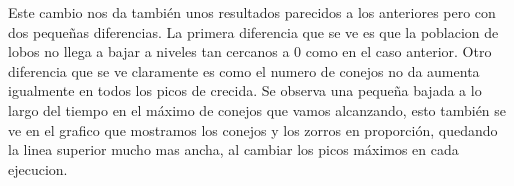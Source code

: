 \documentclass[]{article}
\begin{document}
\begin{figure}[H]
	\centering
	
\end{figure}

Este cambio nos da también unos resultados parecidos a los anteriores pero con dos pequeñas diferencias. La primera diferencia que se ve es que la poblacion de lobos no llega a bajar a niveles tan cercanos a 0 como en el caso anterior. Otro diferencia que se ve claramente es como el numero de conejos no da aumenta igualmente en todos los picos de crecida. Se observa una pequeña bajada a lo largo del tiempo en el máximo de conejos que vamos alcanzando, esto también se ve en el grafico que mostramos los conejos y los zorros en proporción, quedando la linea superior mucho mas ancha, al cambiar los picos máximos en cada ejecucion. 
\newpage
\end{document}
